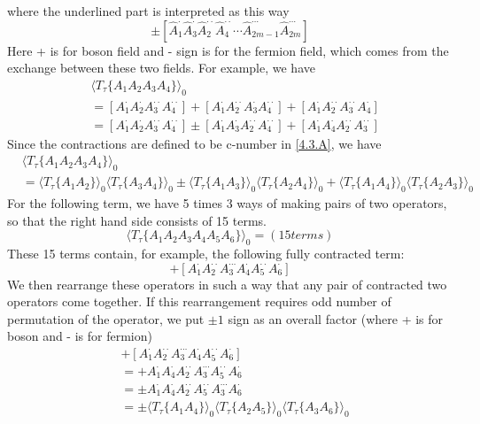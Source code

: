 where the underlined part is interpreted as this way
$$
\pm\left[\hat{A}_1^{\cdot} \hat{A}_3^{\cdot} \hat{A}_2^{\cdot\cdot} \hat{A}_4^{\cdot\cdot} \cdots \hat{A}_{2m-1}^{\cdots} \hat{A}_{2m}^{\cdots}\right]
$$
Here + is for boson field and - sign is for the fermion field, which comes from the exchange between these two fields.
For example, we have
$$
\begin{aligned}
&\langle T_\tau\{A_1A_2A_3A_4\}\rangle_0\\
&=\left[A_1^\cdot A_2^\cdot A_3^{\cdot\cdot} A_4^{\cdot\cdot}\right] + \left[A_1^\cdot A_2^{\cdot\cdot} A_3^\cdot A_4^{\cdot\cdot}\right] +
\left[A_1^\cdot A_2^{\cdot\cdot} A_3^{\cdot\cdot} A_4^\cdot\right]\\
&=\left[A_1^\cdot A_2^\cdot A_3^{\cdot\cdot} A_4^{\cdot\cdot}\right]\pm\left[A_1^\cdot A_3^\cdot A_2^{\cdot\cdot} A_4^{\cdot\cdot}\right]
+\left[A_1^\cdot A_4^\cdot A_2^{\cdot\cdot} A_3^{\cdot\cdot}\right]
\end{aligned}
$$
Since the contractions are defined to be c-number in \ref{4.3.A}, we have
$$
\begin{aligned}
&\langle T_\tau\{A_1A_2A_3A_4\}\rangle_0\\
&=\langle T_\tau\{A_1A_2\}\rangle_0\langle T_\tau\{A_3A_4\}\rangle_0\pm\langle T_\tau\{A_1A_3\}\rangle_0\langle T_\tau\{A_2A_4\}\rangle_0
+\langle T_\tau\{A_1A_4\}\rangle_0\langle T_\tau\{A_2A_3\}\rangle_0
\end{aligned}
$$
For the following term, we have 5 times 3 ways of making pairs of two operators, so that the right hand side consists of 15 terms.
$$
\langle T_\tau\{A_1A_2A_3A_4A_5A_6\}\rangle_0=(15 terms)
$$
These 15 terms contain, for example, the following fully contracted term:
$$
+\left[A_1^{\cdot}A_2^{\cdot\cdot}A_3^{\cdots}A_4^{\cdot}A_5^{\cdot\cdot}A_6^{\cdot}\right]
$$
We then rearrange these operators in such a way that any pair of contracted two operators come together.
If this rearrangement requires odd number of permutation of the operator, we put $\pm1$ sign as an overall factor (where + is for boson and - is for fermion)
$$
\begin{aligned}
&+\left[A_1^{\cdot}A_2^{\cdot\cdot}A_3^{\cdots}A_4^{\cdot}A_5^{\cdot\cdot}A_6^{\cdot}\right]\\
&=+A_1^{\cdot}A_4^{\cdot}A_2^{\cdot\cdot}A_3^{\cdots}A_5^{\cdot\cdot}A_6^{\cdot}\\
&=\pm A_1^{\cdot}A_4^{\cdot}A_2^{\cdot\cdot}A_5^{\cdot\cdot}A_3^{\cdots}A_6^{\cdot}\\
&=\pm\langle T_\tau\{A_1A_4\}\rangle_0 \langle T_\tau \{A_2A_5\}\rangle_0 \langle T_\tau \{A_3A_6\}\rangle_0
\end{aligned}
$$
